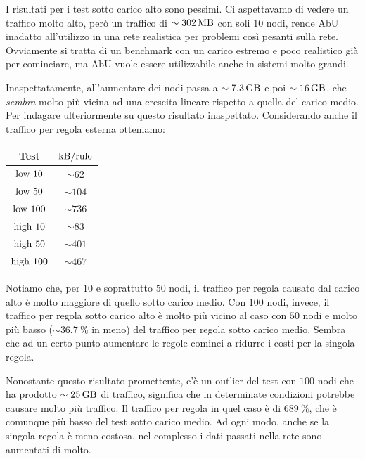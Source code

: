 \documentclass[target=bach]{thud}
\begin{document}
I risultati per i test sotto carico alto sono pessimi. Ci aspettavamo di vedere un traffico molto alto, però un traffico di $\sim\qty{302}{\mega\byte}$ con soli $10$ nodi, rende AbU inadatto all'utilizzo in una rete realistica per problemi così pesanti sulla rete.
Ovviamente si tratta di un benchmark con un carico estremo e poco realistico già per cominciare, ma AbU vuole essere utilizzabile anche in sistemi molto grandi.

Inaspettatamente, all'aumentare dei nodi passa a $\sim\qty{7.3}{\giga\byte}$ e poi $\sim\qty{16}{\giga\byte}$, che \emph{sembra} molto più vicina ad una crescita lineare rispetto a quella del carico medio.
Per indagare ulteriormente su questo risultato inaspettato. Considerando anche il traffico per regola esterna otteniamo:

\begin{tabular}{| c | c |}
    \hline
    Test                          & $\unit{\kilo\byte/rule}$ \\
    \hline
    $\text{\lstinline{low 10}}$   & $\sim62$                 \\
    \hline
    $\text{\lstinline{low 50}}$   & $\sim104$                \\
    \hline
    $\text{\lstinline{low 100}}$  & $\sim736$                \\
    \hline
    $\text{\lstinline{high 10}}$  & $\sim83$                 \\
    \hline
    $\text{\lstinline{high 50}}$  & $\sim401$                \\
    \hline
    $\text{\lstinline{high 100}}$ & $\sim467$                \\
    \hline
\end{tabular}\label{tab:bpr}

Notiamo che, per $10$ e soprattutto $50$ nodi, il traffico per regola causato dal carico alto è molto maggiore di quello sotto carico medio.
Con $100$ nodi, invece, il traffico per regola sotto carico alto è molto più vicino al caso con $50$ nodi e molto più basso ($\sim\qty{36.7}{\percent}$ in meno) del traffico per regola sotto carico medio.
Sembra che ad un certo punto aumentare le regole cominci a ridurre i costi per la singola regola.

Nonostante questo risultato promettente, c'è un outlier del test con $100$ nodi che ha prodotto $\sim\qty{25}{\giga\byte}$ di traffico, significa che in determinate condizioni potrebbe causare molto più traffico.
Il traffico per regola in quel caso è di $\qty{689}{\percent}$, che è comunque più basso del test sotto carico medio.
Ad ogni modo, anche se la singola regola è meno costosa, nel complesso i dati passati nella rete sono aumentati di molto.
\end{document}
